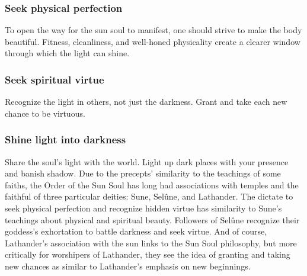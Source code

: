 \documentclass[10pt,a4paper,twoside,twocolumn,openany,bg=print,nodeprecatedcode]{dndbook}
\begin{document}
\subsubsection{Seek physical perfection}
To open the way for the sun soul to manifest, one should strive to make the body beautiful. Fitness, cleanliness, and well-honed physicality create a clearer window through which the light can shine.
\subsubsection{Seek spiritual virtue}
Recognize the light in others, not just the darkness. Grant and take each new chance to be virtuous.
\subsubsection{Shine light into darkness}
Share the soul's light with the world. Light up dark places with your presence and banish shadow.
Due to the precepts' similarity to the teachings of some faiths, the Order of the Sun Soul has long had associations with temples and the faithful of three particular deities: Sune, Selûne, and Lathander. The dictate to seek physical perfection and recognize hidden virtue has similarity to Sune's teachings about physical and spiritual beauty. Followers of Selûne recognize their goddess's exhortation to battle darkness and seek virtue. And of course, Lathander's association with the sun links to the Sun Soul philosophy, but more critically for worshipers of Lathander, they see the idea of granting and taking new chances as similar to Lathander's emphasis on new beginnings.
\end{document}
